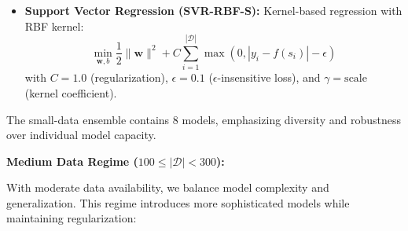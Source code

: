 \documentclass[conference]{IEEEtran}
\begin{document}
\begin{itemize}
    \item \textbf{Support Vector Regression (SVR-RBF-S):} Kernel-based regression with RBF kernel:
    \begin{equation}
    \min_{\mathbf{w}, b} \frac{1}{2}\|\mathbf{w}\|^2 + C\sum_{i=1}^{|\mathcal{D}|} \max(0, |y_i - f(s_i)| - \epsilon)
    \end{equation}
    with $C = 1.0$ (regularization), $\epsilon = 0.1$ ($\epsilon$-insensitive loss), and $\gamma = \text{scale}$ (kernel coefficient).
\end{itemize}

The small-data ensemble contains 8 models, emphasizing diversity and robustness over individual model capacity.

\textbf{Medium Data Regime ($100 \leq |\mathcal{D}| < 300$):}

With moderate data availability, we balance model complexity and generalization. This regime introduces more sophisticated models while maintaining regularization:
\end{document}
